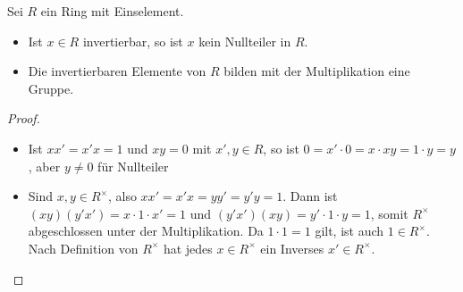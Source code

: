 \begin{proposition}
	Sei $R$ ein Ring mit Einselement. 
	\begin{itemize}
		\item Ist $x \in R$ invertierbar, so ist $x$ kein Nullteiler in $R$.
		\item Die invertierbaren Elemente von $R$ bilden mit der Multiplikation eine Gruppe.
	\end{itemize}
\end{proposition}
\begin{proof}
	\begin{itemize}
		\item Ist $xx'=x'x=1$ und $xy=0$ mit $x',y \in R$, so ist $0=x'\cdot 0=x\cdot xy=1\cdot y=y$, aber
		$y \neq 0$ für Nullteiler
		\item Sind $x,y \in R^{\times}$, also $xx'=x'x=yy'=y'y=1$. Dann ist $(xy)(y'x')=x\cdot 1\cdot x'=1$
		und $(y'x')(xy)=y'\cdot 1\cdot y=1$, somit $R^{\times}$ abgeschlossen unter der Multiplikation. Da 
		$1 \cdot 1=1$ gilt, ist auch $1 \in R^{\times}$. Nach Definition von $R^{\times}$ hat jedes $x \in 
		R^{\times}$ ein Inverses $x' \in R^{\times}$.
	\end{itemize}
\end{proof}